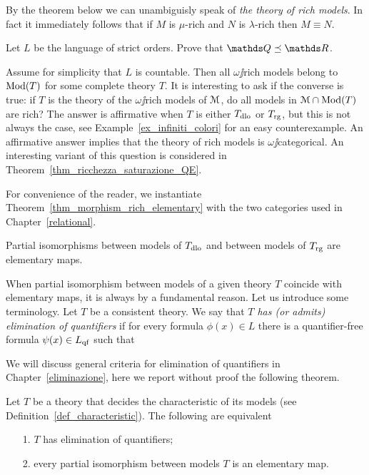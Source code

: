\documentclass[creche.tex]{subfiles}
\begin{document}
By the theorem below  we can unambiguisly speak of \emph{the theory of rich models}. In fact it immediately follows that if $M$ is $\mu$-rich and $N$ is $\lambda$-rich then $M\equiv N$.

\begin{exercise}
Let $L$ be the language of strict orders. Prove that $\QQ\preceq\RR$.\QED
\end{exercise}

Assume for simplicity that $L$ is countable. Then all $\omega\jj$rich models belong to $\mathop{\rm Mod}(T)$ for some complete theory $T$. It is interesting to ask if the converse is true: if $T$ is the theory of the $\omega\jj$rich models of $\EuScript M$, do all models in $\EuScript M\cap \mathop{\rm Mod}(T)$ are rich?  The answer is affirmative when $T$ is either $T_{\rm dlo}$ or $T_{\rm rg}$, but this is not always the case, see Example~\ref{ex_infiniti_colori} for an easy counterexample. An affirmative answer implies that the theory of rich models is $\omega\jj$categorical. An interesting variant of this question is considered in Theorem~\ref{thm_ricchezza_saturazione_QE}.

For convenience of the reader, we instantiate Theorem~\ref{thm_morphism_rich_elementary} with the two categories used in Chapter~\ref{relational}.

\begin{corollary}\label{coroll_tutteleimmersionisonoelementari=eliminazioneqantificatori}
Partial isomorphisms between models of $T_{\rm dlo}$ and between models of $T_{\rm rg}$ are elementary maps.\QED
\end{corollary}

When partial isomorphism between models of a given theory $T$ coincide with elementary maps, it is always by a fundamental reason. Let us introduce some terminology. Let $T$ be a consistent theory. We say that \emph{$T$ has (or admits) elimination of quantifiers\/} if for every formula $\phi(x)\in L$ there is a quantifier-free formula $\psi(x)\in L_{\rm qf}$ such that 


We will discuss general criteria for elimination of quantifiers in Chapter~\ref{eliminazione}, here we report without proof the following theorem.

\begin{theorem}\label{thm_tutteleimmersionisonoelementari=eliminazioneqantificatori}
Let $T$ be a theory that decides the characteristic of its models (see Definition~\ref{def_characteristic}). The following are equivalent
\begin{itemize}
\item[1.] $T$ has elimination of quantifiers;
\item[2.] every partial isomorphism between models $T$ is an elementary map.\QED
\end{itemize}
\end{theorem}
\end{document}
